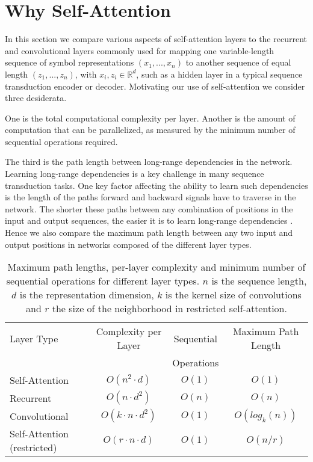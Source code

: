  
\section{Why Self-Attention}

In this section we compare various aspects of self-attention layers to the recurrent and convolutional layers commonly used for mapping one variable-length sequence of symbol representations $(x_1, ..., x_n)$ to another sequence of equal length $(z_1, ..., z_n)$, with $x_i, z_i \in \mathbb{R}^d$, such as a hidden layer in a typical sequence transduction encoder or decoder. Motivating our use of self-attention we consider three desiderata.

One is the total computational complexity per layer.
Another is the amount of computation that can be parallelized, as measured by the minimum number of sequential operations required.

The third is the path length between long-range dependencies in the network. Learning long-range dependencies is a key challenge in many sequence transduction tasks. One key factor affecting the ability to learn such dependencies is the length of the paths forward and backward signals have to traverse in the network. The shorter these paths between any combination of positions in the input and output sequences, the easier it is to learn long-range dependencies \citep{hochreiter2001gradient}. Hence we also compare the maximum path length between any two input and output positions in networks composed of the different layer types.

\begin{table}[t]
\caption{
  Maximum path lengths, per-layer complexity and minimum number of sequential operations for different layer types. $n$ is the sequence length, $d$ is the representation dimension, $k$ is the kernel size of convolutions and $r$ the size of the neighborhood in restricted self-attention.}
\label{tab:op_complexities}
\begin{center}
\vspace{-1mm}

\begin{tabular}{lccc}
\toprule
Layer Type & Complexity per Layer & Sequential & Maximum Path Length  \\
           &             & Operations &   \\
\hline
\rule{0pt}{2.0ex}Self-Attention & $O(n^2 \cdot d)$ & $O(1)$ & $O(1)$ \\
Recurrent & $O(n \cdot d^2)$ & $O(n)$ & $O(n)$ \\

Convolutional & $O(k \cdot n \cdot d^2)$ & $O(1)$ & $O(log_k(n))$ \\
Self-Attention (restricted)& $O(r \cdot n \cdot d)$ & $O(1)$ & $O(n/r)$ \\

\bottomrule
\end{tabular}

\end{center}
\end{table}

